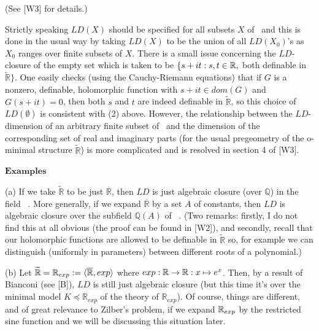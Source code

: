 \documentclass[12pt,nodate]{article}
\begin{document}
\noindent
(See [W3] for details.)

\vspace{3mm}

Strictly speaking $LD(X)$ should be specified for all subsets $X$ of \C\  and this is done in the usual way by taking $LD(X)$ to be the union of all $LD(X_0)$'s as $X_0$ ranges over finite subsets of $X$. There is a small issue concerning the $LD$-closure of the empty set which is taken to be $\{ s+ i t : s,t \in \mathbb{R},$ both definable in  $\widetilde{\mathbb{R}} \}$. One easily checks (using the Cauchy-Riemann equations) that if $G$ is a nonzero, definable, holomorphic
function with $s+ i t \in dom(G)$ and  $G(s+ i t) = 0$, then both $s$ and $t$ are indeed definable in $\widetilde{\mathbb{R}}$, so this choice of $LD(\emptyset )$ is consistent with (2) above. However, the relationship between the $LD$-dimension of an arbitrary finite subset of \C\ and the dimension of the corresponding set of real and imaginary parts (for the usual pregeometry of the o-minimal structure $\widetilde{\mathbb{R}}$) is more complicated and is resolved in section 4 of [W3].

\vspace{3mm}

\noindent
$\mathbf{Examples}$

\vspace{2mm}

\noindent 
(a) If we take $\widetilde{\mathbb{R}}$ to be just $\overline{\mathbb{R}}$, then $LD$ is just algebraic closure (over $\mathbb{Q}$) in the field \C\ . More generally, if we expand $\overline{\mathbb{R}}$ by a set $A$ of constants, then $LD$ is algebraic closure over the subfield $\mathbb{Q}(A)$ of \C\ . (Two remarks: firstly, I do not find this at all obvious (the proof can be found in [W2]), and secondly, recall that our holomorphic functions are allowed to be definable in $\widetilde{\mathbb{R}}$ so, for example we can distinguish (uniformly in parameters) between different roots of a polynomial.)

\vspace{2mm}

\noindent 
(b) Let $\widetilde{\mathbb{R}} = \mathbb{R}_{exp} := \langle \overline{\mathbb{R}}, exp \rangle$ where $exp: \mathbb{R} \rightarrow \mathbb{R} : x \mapsto e^x$. Then, by a result of Bianconi (see [B]), $LD$ is still just algebraic closure (but this time it's over the minimal model $K \preccurlyeq \mathbb{R}_{exp}$ of the theory of
$\mathbb{R}_{exp}$). Of course, things are different, and of great relevance to Zilber's problem, if we expand $\mathbb{R}_{exp}$ by the restricted sine function and we will be discussing this situation later.
\end{document}
